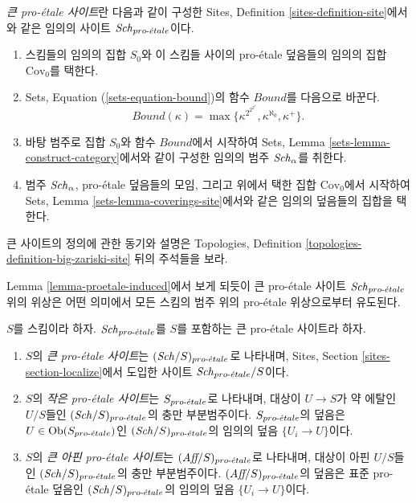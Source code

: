 \begin{definition}
\label{definition-big-proetale-site}
{\it 큰 pro-\'etale 사이트}란 다음과 같이 구성한 Sites, Definition
\ref{sites-definition-site}에서와 같은 임의의 사이트 $\mathit{Sch}_{pro\text{-}\acute{e}tale}$이다.
\begin{enumerate}
\item 스킴들의 임의의 집합 $S_0$와 이 스킴들 사이의 pro-\'etale 덮음들의
임의의 집합 $\text{Cov}_0$를 택한다.
\item Sets, Equation (\ref{sets-equation-bound})의 함수 $Bound$를 다음으로 바꾼다.
$$
Bound(\kappa) = \max\{\kappa^{2^{2^{2^\kappa}}}, \kappa^{\aleph_0}, \kappa^+\}.
$$
\item 바탕 범주로 집합 $S_0$와 함수 $Bound$에서 시작하여 Sets, Lemma
\ref{sets-lemma-construct-category}에서와 같이 구성한 임의의 범주
$\mathit{Sch}_\alpha$를 취한다.
\item 범주 $\mathit{Sch}_\alpha$, pro-\'etale 덮음들의 모임, 그리고 위에서 택한
집합 $\text{Cov}_0$에서 시작하여 Sets, Lemma
\ref{sets-lemma-coverings-site}에서와 같은 임의의 덮음들의 집합을 택한다.
\end{enumerate}
\end{definition}

\noindent
큰 사이트의 정의에 관한 동기와 설명은 Topologies, Definition
\ref{topologies-definition-big-zariski-site} 뒤의 주석들을 보라.

\medskip\noindent
Lemma \ref{lemma-proetale-induced}에서 보게 되듯이 큰 pro-\'etale 사이트
$\mathit{Sch}_{pro\text{-}\acute{e}tale}$ 위의 위상은 어떤 의미에서 모든 스킴의 범주 위의
pro-\'etale 위상으로부터 유도된다.

\begin{definition}
\label{definition-big-small-proetale}
$S$를 스킴이라 하자. $\mathit{Sch}_{pro\text{-}\acute{e}tale}$를 $S$를 포함하는 큰
pro-\'etale 사이트라 하자.
\begin{enumerate}
\item $S$의 {\it 큰 pro-\'etale 사이트}는 $(\mathit{Sch}/S)_{pro\text{-}\acute{e}tale}$로
나타내며, Sites, Section \ref{sites-section-localize}에서 도입한
사이트 $\mathit{Sch}_{pro\text{-}\acute{e}tale}/S$이다.
\item $S$의 {\it 작은 pro-\'etale 사이트}는 $S_{pro\text{-}\acute{e}tale}$로 나타내며,
대상이 $U \to S$가 약 에탈인 $U/S$들인 $(\mathit{Sch}/S)_{pro\text{-}\acute{e}tale}$의
충만 부분범주이다. $S_{pro\text{-}\acute{e}tale}$의 덮음은
$U \in \mathop{\mathrm{Ob}}\nolimits(S_{pro\text{-}\acute{e}tale})$인 $(\mathit{Sch}/S)_{pro\text{-}\acute{e}tale}$의 임의의 덮음
$\{U_i \to U\}$이다.
\item $S$의 {\it 큰 아핀 pro-\'etale 사이트}는
$(\textit{Aff}/S)_{pro\text{-}\acute{e}tale}$로 나타내며, 대상이 아핀 $U/S$들인
$(\mathit{Sch}/S)_{pro\text{-}\acute{e}tale}$의 충만 부분범주이다.
$(\textit{Aff}/S)_{pro\text{-}\acute{e}tale}$의 덮음은 표준 pro-\'etale 덮음인
$(\mathit{Sch}/S)_{pro\text{-}\acute{e}tale}$의 임의의 덮음 $\{U_i \to U\}$이다.
\end{enumerate}
\end{definition}

